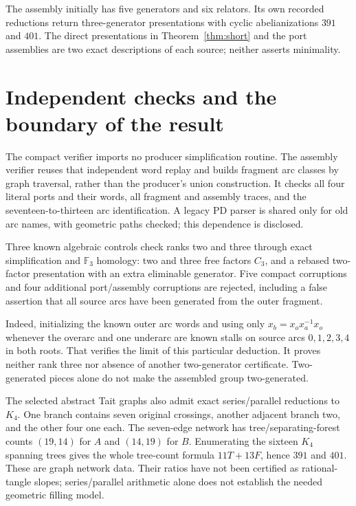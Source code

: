 \documentclass[11pt]{article}
\begin{document}
The assembly initially has five generators and six relators. Its own
recorded reductions return three-generator presentations with cyclic
abelianizations $391$ and $401$. The direct presentations in
Theorem~\ref{thm:short} and the port assemblies are two exact descriptions
of each source; neither asserts minimality.

\section{Independent checks and the boundary of the result}

The compact verifier imports no producer simplification routine.
The assembly verifier reuses that independent word replay and builds
fragment arc classes by graph traversal, rather than the producer's
union construction. It checks all four literal ports and their words,
all fragment and assembly traces, and the seventeen-to-thirteen arc
identification. A legacy PD parser is shared only for old arc names,
with geometric paths checked; this dependence is disclosed.

Three known algebraic controls check ranks two and three
through exact simplification and $\mathbb F_3$ homology: two and three
free factors $C_3$, and a rebased two-factor presentation with an extra
eliminable generator. Five compact corruptions and four additional
port/assembly corruptions are rejected, including a false assertion
that all source arcs have been generated from the outer fragment.

Indeed, initializing the known outer arc words and using only
$x_b=x_o x_a^{-1}x_o$ whenever the overarc and one underarc are known
stalls on source arcs $0,1,2,3,4$ in both roots. That verifies the limit
of this particular deduction. It proves neither rank three nor absence
of another two-generator certificate. Two-generated pieces alone do
not make the assembled group two-generated.

The selected abstract Tait graphs also admit exact series/parallel
reductions to $K_4$. One branch contains seven original crossings,
another adjacent branch two, and the other four one each. The seven-edge
network has tree/separating-forest counts $(19,14)$ for $A$ and $(14,19)$
for $B$. Enumerating the sixteen $K_4$ spanning trees gives the whole
tree-count formula $11T+13F$, hence $391$ and $401$. These are graph
network data. Their ratios have not been certified as rational-tangle
slopes; series/parallel arithmetic alone does not establish the needed
geometric filling model.
\end{document}

